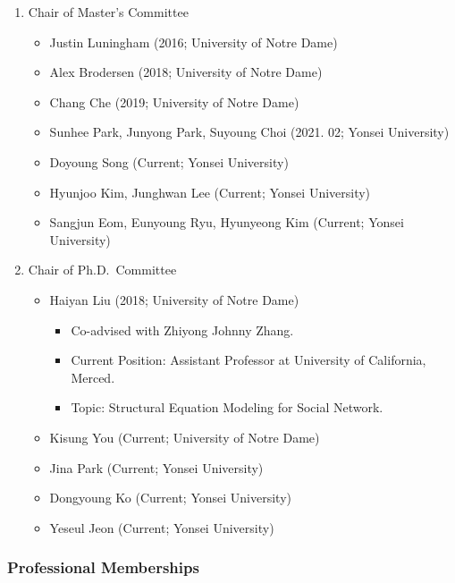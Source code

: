 \documentclass[
]{book}
\providecommand{\tightlist}{%
  \setlength{\itemsep}{0pt}\setlength{\parskip}{0pt}}
\begin{document}
\begin{enumerate}
\def\labelenumi{\arabic{enumi}.}
\item
  Chair of Master's Committee

  \begin{itemize}
  \tightlist
  \item
    Justin Luningham (2016; University of Notre Dame)
  \item
    Alex Brodersen (2018; University of Notre Dame)
  \item
    Chang Che (2019; University of Notre Dame)
  \item
    Sunhee Park, Junyong Park, Suyoung Choi (2021. 02; Yonsei University)
  \item
    Doyoung Song (Current; Yonsei University)
  \item
    Hyunjoo Kim, Junghwan Lee (Current; Yonsei University)
  \item
    Sangjun Eom, Eunyoung Ryu, Hyunyeong Kim (Current; Yonsei University)
  \end{itemize}
\item
  Chair of Ph.D.~Committee

  \begin{itemize}
  \tightlist
  \item
    Haiyan Liu (2018; University of Notre Dame)

    \begin{itemize}
    \tightlist
    \item
      Co-advised with Zhiyong Johnny Zhang.
    \item
      Current Position: Assistant Professor at University of California, Merced.
    \item
      Topic: Structural Equation Modeling for Social Network.
    \end{itemize}
  \item
    Kisung You (Current; University of Notre Dame)
  \item
    Jina Park (Current; Yonsei University)
  \item
    Dongyoung Ko (Current; Yonsei University)
  \item
    Yeseul Jeon (Current; Yonsei University)
  \end{itemize}
\end{enumerate}

\hypertarget{professional-memberships}{%
\subsubsection*{Professional Memberships}\label{professional-memberships}}
\end{document}
